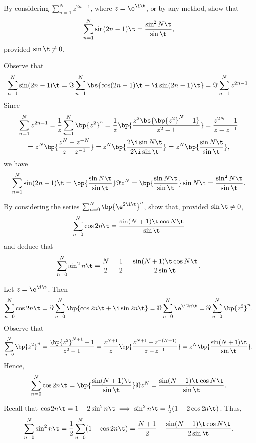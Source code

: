 \begin{problem}
    By considering $\sum_{n=1}^N z^{2n-1}$, where $z = \e^{\i\t}$, or by any method, show that \[\sum_{n=1}^N \sin (2n-1)\t = \frac{\sin^2 N\t}{\sin \t},\] provided $\sin \t \neq 0$.
\end{problem}
\begin{solution}
    Observe that \[\sum_{n=1}^N \sin(2n-1)\t = \Im \sum_{n=1}^N \bs{\cos(2n-1)\t + \i\sin(2n-1)\t} = \Im \sum_{n=1}^N z^{2n-1}.\] Since
    \begin{gather*}
        \sum_{n=1}^N z^{2n-1} = \frac1z \sum_{n=1}^N \bp{z^2}^n = \frac1z \bp{\frac{z^2 \bs{\bp{z^2}^N - 1}}{z^2 - 1}} = \frac{z^{2N} - 1}{z - z^{-1}}\\
        = z^N \bp{\frac{z^N - z^{-N}}{z - z^{-1}}} = z^N \bp{\frac{2\i \sin N\t}{2\i \sin \t}} = z^N \bp{\frac{\sin N\t}{\sin \t}},
    \end{gather*}
    we have \[\sum_{n=1}^N \sin(2n-1)\t = \bp{\frac{\sin N\t}{\sin \t}}\Im{z^N} = \bp{\frac{\sin N\t}{\sin \t}} \sin N\t = \frac{\sin^2 N\t}{\sin \t}.\]
\end{solution}

\begin{problem}
    By considering the series $\sum_{n=0}^N \bp{\e^{2\i\t}}^n$, show that, provided $\sin \t \neq 0$, \[\sum_{n = 0}^N \cos 2n\t = \frac{\sin(N+1)\t \cos N\t}{\sin \t}\] and deduce that \[\sum_{n = 0}^N \sin^2 n\t = \frac{N}2 + \frac12 - \frac{\sin(N+1)\t \cos N\t}{2\sin\t}.\]
\end{problem}
\begin{solution}
    Let $z = \e^{\i\t}$. Then \[\sum_{n = 0}^N \cos 2n\t = \Re \sum_{n = 0}^N \bp{\cos 2n\t + \i\sin 2n\t} = \Re \sum_{n=0}^{N} \e^{\i2n\t} = \Re \sum_{n=0}^{N} \bp{z^2}^n.\] Observe that \[\sum_{n=0}^{N} \bp{z^2}^n = \frac{\bp{z^2}^{N+1} - 1}{z^2 - 1} = \frac{z^{N+1}}{z} \bp{\frac{z^{N+1} - z^{-(N+1)}}{z - z^{-1}}} = z^N \bp{\frac{\sin (N+1)\t}{\sin \t}}.\] Hence, \[\sum_{n = 0}^N \cos 2n\t = \bp{\frac{\sin (N+1)\t}{\sin \t}} \Re{z^N} = \frac{\sin(N+1)\t \cos N\t}{\sin \t}.\]

    Recall that $\cos 2n\t = 1 - 2\sin^2 n\t \implies \sin^2 n\t = \frac12 (1 - 2\cos 2n\t)$. Thus, \[\sum_{n = 0}^N \sin^2 n\t = \frac12 \sum_{n = 0}^N (1 - \cos 2n\t) = \frac{N + 1}2 - \frac{\sin(N+1)\t \cos N\t}{2\sin\t}.\]
\end{solution}

